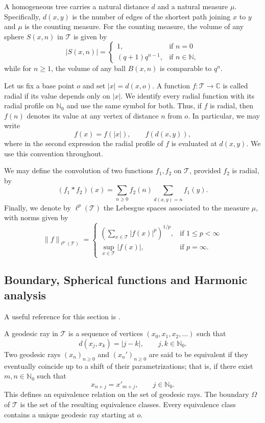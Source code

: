 \documentclass[11pt,a4paper,reqno]{amsart}
\renewcommand\mathcal{\mathscr}
\theoremstyle{plain}
\theoremstyle{remark}
\theoremstyle{definition}
\theoremstyle{remark}
\numberwithin{equation}{section}
\begin{document}
	A homogeneous tree carries a natural distance $d$ and a natural measure $\mu$. Specifically, $d(x,y)$ is the number of edges of the shortest path joining $x$ to $y$ and $\mu$ is the counting measure. For the counting measure, the volume of any sphere $S(x,n)$ in $\mathcal{T}$ is given by
	\[
	|S(x,n)|=\begin{cases}
		1, & \text{if } n=0\\
		(q+1)q^{n-1}, & \text{if } n\in \mathbb{N},
	\end{cases}
	\]
	while for $n \geq 1$, the volume of any ball $B(x,n)$ is comparable to $q^{n}$.
	
	Let us fix a base point $o$ and set $|x|=d(x,o)$. A function
$f:\mathcal T\to\mathbb C$ is called radial if its value depends only
on $|x|$. We identify every radial function with its radial profile on
$\mathbb{N}_0$ and use the same symbol for both. Thus, if $f$ is radial,
then $f(n)$ denotes its value at any vertex of distance $n$ from $o$.
In particular, we may write
\[
f(x)=f(|x|),\qquad
f(d(x,y)),
\]
where in the second expression the radial profile of $f$ is evaluated
at $d(x,y)$. We use this convention throughout.

    
	We may define the convolution of two functions $f_1, f_2$ on $\mathcal{T}$,  provided $f_2$ is radial, by
	\begin{equation}\label{convradial}
		(f_1\ast f_2)(x)=\sum\limits_{n\geq 0}f_2(n)\sum\limits_{d(x,y)=n}f_1(y).
	\end{equation}
	Finally, we denote by  $\ell^p(\mathcal{T})$ the Lebesgue spaces  associated to the measure $\mu$, with norms given by
	\[
	\|f\|_{\ell^p(\mathcal{T})}=
	\begin{cases}
		\left(\sum\limits_{x\in\mathcal{T}}|f(x)|^p \right)^{1/p}, & \text{if } 1\leq p<\infty\\
		\sup\limits_{x\in\mathcal{T}}|f(x)|, & \text{if } p=\infty.
	\end{cases}
	\]
	
	\subsection{Boundary, Spherical functions and Harmonic analysis} \label{sec:HA}

	A useful reference for this section is \cite{CMS0}. 
	
	A geodesic ray in $\mathcal T$ is a sequence of vertices
$(x_0,x_1,x_2,\ldots)$ such that
\[
d(x_j,x_k)=|j-k|,
\qquad j,k\in\mathbb N_0.
\]
Two geodesic rays $(x_n)_{n\geq0}$ and $(x_n')_{n\geq0}$ are said to
be equivalent if they eventually coincide up to a shift of their
parametrizations; that is, if there exist $m,n\in\mathbb N_0$ such
that
\[
x_{n+j}=x'_{m+j},
\qquad j\in\mathbb N_0.
\]
This defines an equivalence relation on the set of geodesic rays.
The boundary $\Omega$ of $\mathcal T$ is the set of the resulting
equivalence classes. Every equivalence class contains a unique
geodesic ray starting at $o$.
\end{document}
